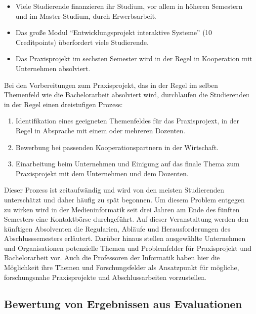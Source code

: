 \begin{itemize}
\tightlist
\item
  Viele Studierende finanzieren ihr Studium, vor allem in höheren
  Semestern und im Master-Studium, durch Erwerbsarbeit.
\item
  Das große Modul ``Entwicklungsprojekt interaktive Systeme'' (10
  Creditpoints) überfordert viele Studierende.
\item
  Das Praxisprojekt im sechsten Semester wird in der Regel in
  Kooperation mit Unternehmen absolviert.
\end{itemize}

Bei den Vorbereitungen zum Praxisprojekt, das in der Regel im selben
Themenfeld wie die Bachelorarbeit absolviert wird, durchlaufen die
Studierenden in der Regel einen dreistufigen Prozess:

\begin{enumerate}
\def\labelenumi{\arabic{enumi}.}
\tightlist
\item
  Identifikation eines geeigneten Themenfeldes für das Praxisprojext, in
  der Regel in Absprache mit einem oder mehreren Dozenten.
\item
  Bewerbung bei passenden Kooperationspartnern in der Wirtschaft.
\item
  Einarbeitung beim Unternehmen und Einigung auf das finale Thema zum
  Praxisprojekt mit dem Unternehmen und dem Dozenten.
\end{enumerate}

Dieser Prozess ist zeitaufwändig und wird von den meisten Studierenden
unterschätzt und daher häufig zu spät begonnen. Um diesem Problem
entgegen zu wirken wird in der Medieninformatik seit drei Jahren am Ende
des fünften Semesters eine Kontaktbörse durchgeführt. Auf dieser
Veranstaltung werden den künftigen Absolventen die Regularien, Abläufe
und Herausforderungen des Abschlusssemesters erläutert. Darüber hinaus
stellen ausgewählte Unternehmen und Organisationen potenzielle Themen
und Problemfelder für Praxisprojekt und Bachelorarbeit vor. Auch die
Professoren der Informatik haben hier die Möglichkeit ihre Themen und
Forschungsfelder als Ansatzpunkt für mögliche, forschungsnahe
Praxisprojekte und Abschlussarbeiten vorzustellen.

\subsection{Bewertung von Ergebnissen aus
Evaluationen}\label{bewertung-von-ergebnissen-aus-evaluationen}

